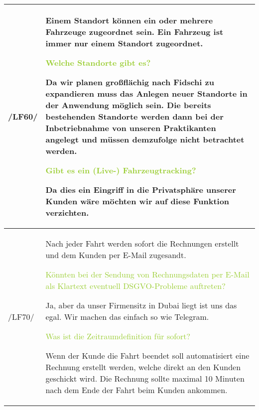 \begin{tabular}[ht] {l | p{13cm}}
    \hline
    /LF60/ & Einem Standort können ein oder mehrere Fahrzeuge zugeordnet sein. Ein Fahrzeug ist immer nur einem Standort zugeordnet. 
    
    \textcolor{YellowGreen}{Welche Standorte gibt es?}

    \textcolor{NavyBlue}{Da wir planen großflächig nach Fidschi zu expandieren muss das Anlegen neuer Standorte in der Anwendung möglich sein. Die bereits bestehenden Standorte werden dann bei der Inbetriebnahme von unseren Praktikanten angelegt und müssen demzufolge nicht betrachtet werden.}
    
    \textcolor{YellowGreen}{Gibt es ein (Live-) Fahrzeugtracking?}
    
    \textcolor{NavyBlue}{Da dies ein Eingriff in die Privatsphäre unserer Kunden wäre möchten wir auf diese Funktion verzichten.}
    \\
    \hline
    /LF70/ & Nach jeder Fahrt werden sofort die Rechnungen erstellt und dem Kunden per  
    E-Mail zugesandt. 

    \textcolor{YellowGreen}{Könnten bei der Sendung von Rechnungsdaten per E-Mail als Klartext eventuell DSGVO-Probleme auftreten?}

    \textcolor{NavyBlue}{Ja, aber da unser Firmensitz in Dubai liegt ist uns das egal. Wir machen das einfach so wie Telegram.}

    \textcolor{YellowGreen}{Was ist die Zeitraumdefinition für \grqq{}sofort\grqq{}?}

    \textcolor{NavyBlue}{Wenn der Kunde die Fahrt beendet soll automatisiert eine Rechnung erstellt werden, welche direkt an den Kunden geschickt wird. Die Rechnung sollte maximal 10 Minuten nach dem Ende der Fahrt beim Kunden ankommen.}
    \\
    \hline
\end{tabular}

